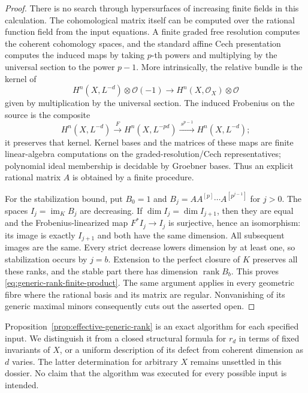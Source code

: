 \begin{proof}
There is no search through hypersurfaces of increasing
finite fields in this calculation.  The cohomological
matrix itself can be computed over the rational function
field from the input equations.  A finite graded free
resolution computes the coherent cohomology spaces, and
the standard affine Cech presentation computes the
induced maps by taking $p$-th powers and multiplying by
the universal section to the power $p-1$.
More intrinsically, the relative bundle is the kernel of
\[
 H^n(X,L^{-d})\otimes\mathcal O(-1)
       \longrightarrow H^n(X,\mathcal O_X)\otimes\mathcal O
\]
given by multiplication by the universal section.
The induced Frobenius on the source is the composite
\[
 H^n(X,L^{-d})
 \xrightarrow{\ F\ }H^n(X,L^{-pd})
 \xrightarrow{\ s^{p-1}\ }H^n(X,L^{-d});
\]
it preserves that kernel.  Kernel bases and the matrices
of these maps are finite linear-algebra computations
on the graded-resolution/Cech representatives; polynomial
ideal membership is decidable by Groebner bases.
Thus an explicit rational matrix $A$ is obtained by a
finite procedure.

For the stabilization bound, put
$B_0=1$ and
$B_j=A A^{[p]}\cdots A^{[p^{j-1}]}$ for $j>0$.
The spaces $I_j=\operatorname{im}_K B_j$ are decreasing.
If $\dim I_j=\dim I_{j+1}$, then they are equal and
the Frobenius-linearized map
$F^*I_j\to I_j$ is surjective, hence an isomorphism:
its image is exactly $I_{j+1}$ and both have the same
dimension.  All subsequent images are the same.
Every strict decrease lowers dimension by at least one,
so stabilization occurs by $j=b$.  Extension to the
perfect closure of $K$ preserves all these ranks, and
the stable part there has dimension $\operatorname{rank}B_b$.
This proves \eqref{eq:generic-rank-finite-product}.
The same argument applies in every geometric fibre
where the rational basis and its matrix are regular.
Nonvanishing of its generic maximal minors consequently
cuts out the asserted open.
\end{proof}

\begin{remark}\label{rem:algorithm-versus-generic-formula}
Proposition~\ref{prop:effective-generic-rank} is an exact
algorithm for each specified input.  We distinguish it
from a closed structural formula for $r_d$ in terms of
fixed invariants of $X$, or a uniform description of its
defect from coherent dimension as $d$ varies.
The latter determination for arbitrary $X$ remains
unsettled in this dossier.  No claim that the algorithm
was executed for every possible input is intended.
\end{remark}

